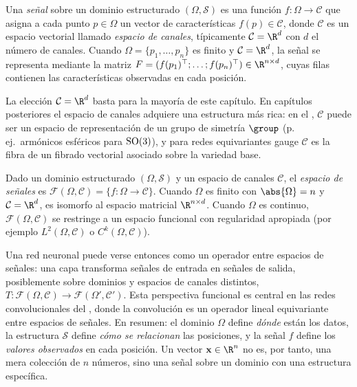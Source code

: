 \begin{definition}[Se\~nal]
\label{def:found:signal}
Una \emph{se\~nal} sobre un dominio estructurado $(\Omega, \mathcal{S})$ es una
funci\'on $f : \Omega \to \mathcal{C}$ que asigna a cada punto $p \in \Omega$ un
vector de caracter\'isticas $f(p) \in \mathcal{C}$, donde $\mathcal{C}$ es un
espacio vectorial llamado \emph{espacio de canales}, t\'ipicamente
$\mathcal{C} = \R^d$ con $d$ el n\'umero de canales. Cuando
$\Omega = \{p_1, \ldots, p_n\}$ es finito y $\mathcal{C} = \R^d$, la se\~nal se
representa mediante la matriz $F = (f(p_1)^\top; \ldots; f(p_n)^\top) \in
\R^{n \times d}$, cuyas filas contienen las caracter\'isticas observadas en cada
posici\'on.
\end{definition}

\begin{remark}
\label{rem:found:channels}
La elecci\'on $\mathcal{C} = \R^d$ basta para la mayor\'ia de este cap\'itulo. En
cap\'itulos posteriores el espacio de canales adquiere una estructura m\'as rica:
en el , $\mathcal{C}$ puede ser un espacio de representaci\'on de
un grupo de simetr\'ia $\group$ (p.\,ej.\ arm\'onicos esf\'ericos para $\operatorname{SO}(3)$), y
para redes equivariantes gauge $\mathcal{C}$ es la fibra de un fibrado vectorial
asociado sobre la variedad base.
\end{remark}

\begin{definition}
\label{def:found:signal-space}
Dado un dominio estructurado $(\Omega, \mathcal{S})$ y un espacio de canales
$\mathcal{C}$, el \emph{espacio de se\~nales} es
$\mathcal{F}(\Omega, \mathcal{C}) = \{f : \Omega \to \mathcal{C}\}$. Cuando
$\Omega$ es finito con $\abs{\Omega} = n$ y $\mathcal{C} = \R^d$, es isomorfo al
espacio matricial $\R^{n \times d}$. Cuando $\Omega$ es continuo,
$\mathcal{F}(\Omega, \mathcal{C})$ se restringe a un espacio funcional con
regularidad apropiada (por ejemplo $L^2(\Omega, \mathcal{C})$ o
$C^k(\Omega, \mathcal{C})$).
\end{definition}

Una red neuronal puede verse entonces como un operador entre espacios de se\~nales:
una capa transforma se\~nales de entrada en se\~nales de salida, posiblemente sobre
dominios y espacios de canales distintos, $T : \mathcal{F}(\Omega, \mathcal{C})
\to \mathcal{F}(\Omega', \mathcal{C}')$. Esta perspectiva funcional es central en
las redes convolucionales del , donde la convoluci\'on es un
operador lineal equivariante entre espacios de se\~nales. En resumen: el dominio
$\Omega$ define \emph{d\'onde} est\'an los datos, la estructura $\mathcal{S}$ define
\emph{c\'omo se relacionan} las posiciones, y la se\~nal $f$ define los
\emph{valores observados} en cada posici\'on. Un vector $\mathbf{x} \in \R^n$ no es,
por tanto, una mera colecci\'on de $n$ n\'umeros, sino una se\~nal sobre un dominio
con una estructura espec\'ifica.

